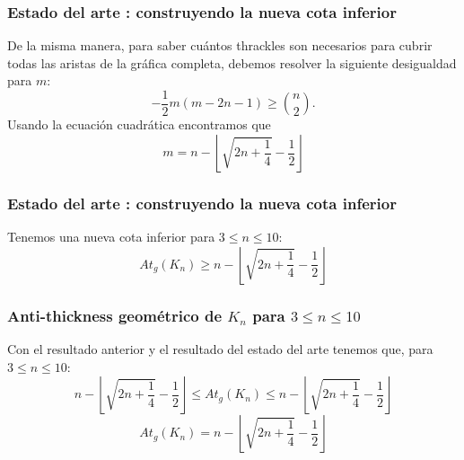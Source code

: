 \begin{frame}
\frametitle{Estado del arte : construyendo la nueva cota inferior}
De la misma manera, para saber cuántos thrackles son necesarios para cubrir todas las aristas de la gráfica completa, debemos 
resolver la siguiente desigualdad para $m$:
\[
-\frac{1}{2}m(m-2n-1) \geq \binom{n}{2}.
\]
Usando la ecuación cuadrática encontramos que \[m =  n - \left\lfloor\sqrt{2n + \frac{1}{4}} - \frac{1}{2} \right\rfloor \]

\end{frame}
\begin{frame}
\frametitle{Estado del arte : construyendo la nueva cota inferior}
\begin{table}
	\centering
\end{table}
Tenemos una nueva cota inferior para $3 \leq n \leq 10$:
\[ At_g(K_n) \geq n - \left\lfloor\sqrt{2n + \frac{1}{4}} - \frac{1}{2} \right\rfloor \] 
\end{frame}
\begin{frame}
\frametitle{Anti-thickness geométrico de $K_n$ para $3\leq n\leq 10$}
Con el resultado anterior y el resultado del estado del arte tenemos que, para $ 3 \leq n \leq 10$:
\[ n - \left\lfloor\sqrt{2n + \frac{1}{4}} - \frac{1}{2} \right\rfloor  \leq At_g(K_n) \leq n - \left\lfloor\sqrt{2n + \frac{1}{4}} - \frac{1}{2} \right\rfloor \] 
\pause
\[ At_g(K_n) = n - \left\lfloor\sqrt{2n + \frac{1}{4}} - \frac{1}{2} \right\rfloor \] 
\end{frame}

